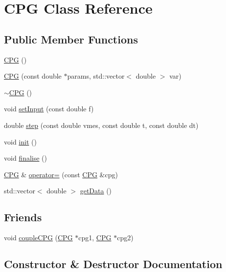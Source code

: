 \hypertarget{class_c_p_g}{}\section{C\+PG Class Reference}
\label{class_c_p_g}
\subsection*{Public Member Functions}
\begin{DoxyCompactItemize}
\item 
\hyperlink{class_c_p_g_a6f5ef8787aca645583e73f4c47cc020a}{C\+PG} ()
\item 
\hyperlink{class_c_p_g_acf66e3055d577a6bb75e457c1abf9f74}{C\+PG} (const double $\ast$params, std\+::vector$<$ double $>$ var)
\item 
\hyperlink{class_c_p_g_aa2cac8504168c1b0190ecc4760ef0cbe}{$\sim$\+C\+PG} ()
\item 
void \hyperlink{class_c_p_g_aeadfff1afc669e80840114ee7e1b5ee2}{set\+Input} (const double f)
\item 
double \hyperlink{class_c_p_g_a0069ed10226ce69f40166e93c349989f}{step} (const double vmes, const double t, const double dt)
\item 
void \hyperlink{class_c_p_g_a745ccc60b1cd67a3dd18f69b3a050b9b}{init} ()
\item 
void \hyperlink{class_c_p_g_a4f04f9438ac4ea0329f2eb6de096a888}{finalise} ()
\item 
\hyperlink{class_c_p_g}{C\+PG} \& \hyperlink{class_c_p_g_ab09de4940c722faf81a4ac1be9aea9a9}{operator=} (const \hyperlink{class_c_p_g}{C\+PG} \&cpg)
\item 
std\+::vector$<$ double $>$ \hyperlink{class_c_p_g_a1e15a331038f18632d0457dc8e954071}{get\+Data} ()
\end{DoxyCompactItemize}
\subsection*{Friends}
\begin{DoxyCompactItemize}
\item 
void \hyperlink{class_c_p_g_a890eb7bc697eb15fbd9cd16229dd2a98}{couple\+C\+PG} (\hyperlink{class_c_p_g}{C\+PG} $\ast$cpg1, \hyperlink{class_c_p_g}{C\+PG} $\ast$cpg2)
\end{DoxyCompactItemize}


\subsection{Constructor \& Destructor Documentation}
